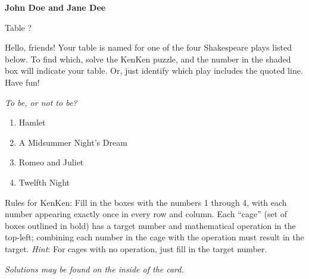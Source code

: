 \documentclass{article}
\newcounter{row}
\newcounter{col}
\edef\puzzlescale{1.2}
\edef\numrows{4}
\newcommand\setrow[\numrows]{
  \setcounter{col}{1}
  \foreach \n in {#1, #2, #3, #4} {
    \edef\x{\value{col} - 1}
    \edef\y{1 + \numrows - \value{row}}
    \node[anchor=north west,scale=0.75*\puzzlescale] at (\x, \y) {\n};
    \stepcounter{col}
  }
  \stepcounter{row}
}
\newcommand\boldh[3]{
  \edef\y{\numrows-#1}
  \edef\x{#2}
  \edef\z{\x + #3}
  \draw[very thick] (\x, \y) -- (\z, \y);
}
\newcommand\boldv[3]{
  \edef\y{\numrows-#1}
  \edef\x{#2}
  \edef\z{\y - #3}
  \draw[ultra thick] (\x, \y) -- (\x, \z);
}
\newcommand\shadebox[2]{
  \edef\y{\numrows-#1}
  \edef\x{#2}
  \fill[shadegray] (\x, \y) rectangle (\x+1,\y-1);
}
\begin{document}
\begin{center}
  \large \textbf{John Doe and Jane Dee}

  Table ?
\end{center}

Hello, friends! 
Your table is named for one of the four Shakespeare plays listed
below.  To find which, solve the KenKen puzzle, and the number in the
shaded box will indicate your table.  Or, just identify which
play includes the quoted line.  Have fun!

\medskip

\begin{minipage}[top]{0.5\textwidth}
  \textit{To be, or not to be?}
  \begin{enumerate}
  \item Hamlet
  \item A Midsummer Night's Dream
  \item Romeo and Juliet
  \item Twelfth Night
  \end{enumerate}
\end{minipage}
%
\begin{minipage}[top]{0.5\textwidth}
\end{minipage}
%

Rules for KenKen: Fill in the boxes with the numbers 1 through 4, with
each number appearing exactly once in every row and column.  Each
``cage'' (set of boxes outlined in bold) has a target number
and mathematical operation in the top-left; combining each
number in the cage with the operation must result in the target.
\textit{Hint}: For cages with no operation, just fill in the
  target number.

\begin{center}
\it Solutions may be found on the inside of the card.
\end{center}
\end{document}
